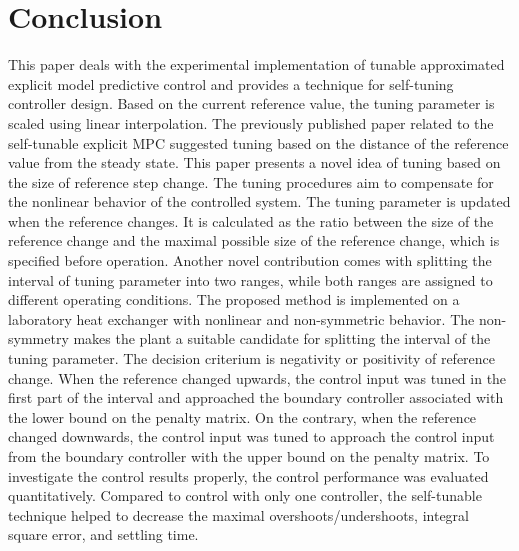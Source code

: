 \documentclass[preprint,12pt]{elsarticle}
\begin{document}
\section{Conclusion}
\label{sec:conclusion}
This paper deals with the experimental implementation of tunable approximated explicit model predictive control and provides a technique for self-tuning controller design. Based on the current reference value, the tuning parameter is scaled using linear interpolation. The previously published paper related to the self-tunable explicit MPC suggested tuning based on the distance of the reference value from the steady state. This paper presents a novel idea of tuning based on the size of reference step change. The tuning procedures aim to compensate for the nonlinear behavior of the controlled system. The tuning parameter is updated when the reference changes. It is calculated as the ratio between the size of the reference change and the maximal possible size of the reference change, which is specified before operation. Another novel contribution comes with splitting the interval of tuning parameter into two ranges, while both ranges are assigned to different operating conditions. The proposed method is implemented on a laboratory heat exchanger with nonlinear and non-symmetric behavior. The non-symmetry makes the plant a suitable candidate for splitting the interval of the tuning parameter. The decision criterium is negativity or positivity of reference change. When the reference changed upwards, the control input was tuned in the first part of the interval and approached the boundary controller associated with the lower bound on the penalty matrix. On the contrary, when the reference changed downwards, the control input was tuned to approach the control input from the boundary controller with the upper bound on the penalty matrix. To investigate the control results properly, the control performance was evaluated quantitatively. Compared to control with only one controller, the self-tunable technique helped to decrease the maximal overshoots/undershoots, integral square error, and settling time.




 



%
%
%
\end{document}
